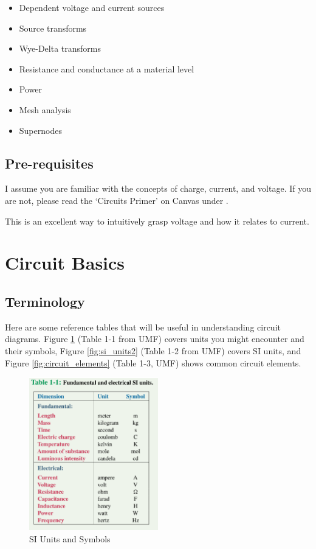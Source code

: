 \documentclass{article}
\begin{document}
\begin{itemize}
  \item Dependent voltage and current sources
  \item Source transforms
  \item Wye-Delta transforms
  \item Resistance and conductance at a material level
  \item Power
  \item Mesh analysis
  \item Supernodes
\end{itemize}

\subsection{Pre-requisites}
I assume you are familiar with the concepts of charge, current, and voltage. If
you are not, please read the `Circuits Primer' on Canvas under . 

This is an excellent way to intuitively grasp voltage and how it relates to current.


\section{Circuit Basics}
\subsection{Terminology}
Here are some reference tables that will be useful in understanding circuit
diagrams. Figure \ref{fig:si_units} (Table 1-1 from UMF) covers units you might
encounter and their symbols, Figure \ref{fig:si_units2} (Table 1-2 from UMF)
covers SI units, and Figure \ref{fig:circuit_elements} (Table 1-3, UMF) shows common circuit elements.

\begin{figure}[!htbp]
\centering
\includegraphics[width=0.5\textwidth]{table_1-1}
\caption{SI Units and Symbols}
\label{fig:si_units}
\end{figure}
\end{document}
